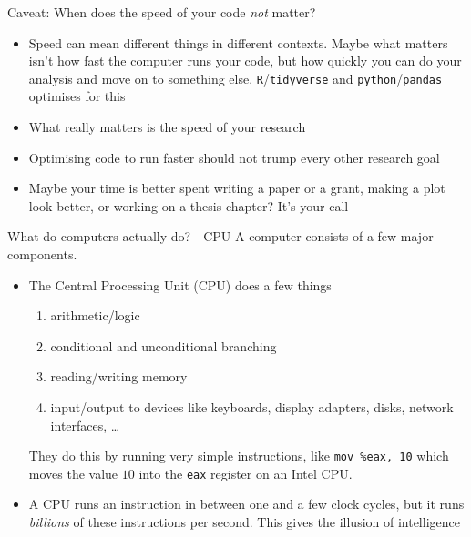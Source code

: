 \documentclass{beamer}
\begin{document}
\begin{frame}{Caveat: When does the speed of your code \emph{not} matter?}
	\begin{itemize}

		\item Speed can mean different things in different contexts. Maybe what
		matters isn't how fast the computer runs your code, but how quickly you
		can do your analysis and move on to something else.
		\texttt{R}/\texttt{tidyverse} and \texttt{python}/\texttt{pandas}
		optimises for this
		
		\item What really matters is the speed of your research  
		
		\item Optimising code to run faster should not trump every other
		research goal
		
		\item Maybe your time is better spent writing a paper or a grant, making
		a plot look better, or working on a thesis chapter? It's your call
		
	\end{itemize}
\end{frame}

\begin{frame}{What do computers actually do? - CPU}
	A computer consists of a few major components.
	\begin{itemize}
		\item The Central Processing Unit (CPU) does a few things
			\begin{enumerate}
				\item arithmetic/logic
				\item conditional and unconditional branching
				\item reading/writing memory
				\item input/output to devices like keyboards, display adapters, disks, network interfaces, \ldots
		\end{enumerate}

		They do this by running very simple instructions, like \texttt{mov
		\%eax, 10} which moves the value $10$ into the \texttt{eax} register on
		an Intel CPU.
		
		\item A CPU runs an instruction in between one and a few clock cycles,
		but it runs \emph{billions} of these instructions per second. This gives
		the illusion of intelligence
		
	\end{itemize}
\end{frame}
\end{document}
